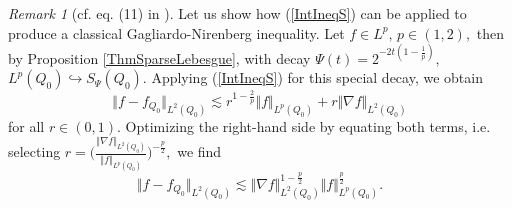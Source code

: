 \documentclass[11pt, a4paper,leqno]{amsart}
\theoremstyle{plain}
\numberwithin{equation}{section}
\theoremstyle{definition}
\theoremstyle{remark}
\newtheorem{remark}{Remark}
\begin{document}
\begin{remark}[cf. eq. (11) in \cite{Ches}] Let us show how (\ref{IntIneqS}) can be
applied to produce a classical Gagliardo-Nirenberg inequality. Let $f\in L^{p}%
,\,p\in(1,2),$ then by Proposition \ref{ThmSparseLebesgue}, with decay $\Psi(t)=2^{-2t(1-\frac
{1}{p})},$
$
L^{p}(Q_{0})\hookrightarrow S_{\Psi}(Q_{0}).$
Applying (\ref{IntIneqS}) for this special decay, we obtain 
\begin{equation*}
\Vert f-f_{Q_{0}}\Vert_{L^{2}(Q_{0})}   \lesssim r^{1-\frac{2}{p}}\Vert f\Vert_{L^{p}(Q_{0})}+r\Vert\nabla
f\Vert_{L^{2}(Q_{0})}
\end{equation*}
for all $r \in (0, 1)$. 
Optimizing the right-hand side by equating both terms, i.e. selecting $r =\Big(  \frac{\Vert\nabla f\Vert_{L^{2}(Q_{0})}}{\Vert f\Vert_{L^{p}(Q_{0}%
)}} \Big)^{-\frac{p}{2}},$ we find
\[
\Vert f-f_{Q_{0}}\Vert_{L^{2}(Q_0)}\lesssim\Vert\nabla f\Vert_{L^{2}(Q_0)}^{1-\frac
{p}{2}}\Vert f\Vert_{L^{p}(Q_0)}^{\frac{p}{2}}.
\]
\end{remark}
\end{document}
